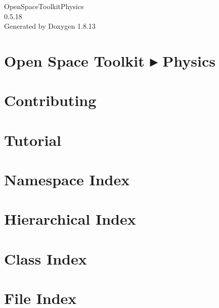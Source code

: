 \documentclass[twoside]{book}
\newcommand{\+}{\discretionary{\mbox{\scriptsize$\hookleftarrow$}}{}{}}
\newcommand{\clearemptydoublepage}{%
  \newpage{\pagestyle{empty}\cleardoublepage}%
}
\begin{document}
\hypersetup{pageanchor=false,
             bookmarksnumbered=true,
             pdfencoding=unicode
            }
\begin{titlepage}
\vspace*{7cm}
\begin{center}%
{\Large Open\+Space\+Toolkit\+Physics \\[1ex]\large 0.\+5.\+18 }\\
\vspace*{1cm}
{\large Generated by Doxygen 1.8.13}\\
\end{center}
\end{titlepage}
\clearemptydoublepage
{}
\tableofcontents
\clearemptydoublepage
{}
\hypersetup{pageanchor=true}

\chapter{Open Space Toolkit ▸ Physics}
\label{index}\hypertarget{index}{}
\chapter{Contributing}
\label{md__c_o_n_t_r_i_b_u_t_i_n_g}

\chapter{Tutorial}
\label{md_docs__tutorial}

\chapter{Namespace Index}

\chapter{Hierarchical Index}

\chapter{Class Index}

\chapter{File Index}

\end{document}
